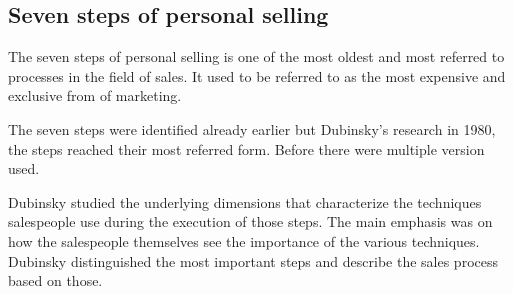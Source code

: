 \documentclass[12pt,a4paper,oneside,pdftex]{report}
\begin{document}
\subsection{Seven steps of personal selling}

The seven steps of personal selling is one of the most oldest and most referred to processes in the field of sales. It used to be referred to as the most expensive and exclusive from of marketing. 

The seven steps were identified already earlier but Dubinsky's research in 1980, the steps reached their most referred form. Before there were multiple version used. 

Dubinsky studied the underlying dimensions that characterize the techniques salespeople use during the execution of those steps. The main emphasis was on how the salespeople themselves see the importance of the various techniques. Dubinsky distinguished the most important steps and describe the sales process based on those. 
\end{document}
